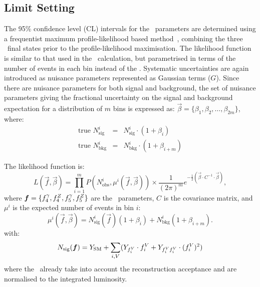 \subsection{Limit Setting}
\label{sec:TGC-LimitSetting}

The 95\% confidence level (CL) intervals for the \TGC\ parameters are determined
using a frequentist maximum profile-likelihood based method~\cite{Cowan:2010js},
combining the three \lllplp\ final states prior to
the profile-likelihood maximisation. The likelihood function is similar
to that used in the \cx\ calculation, but parametrised in terms of the
number of events in each bin instead of the \cx. Systematic uncertainties are
again introduced as nuisance parameters 
represented as Gaussian terms ($G$). Since there are nuisance
parameters for both signal and background, the set of nuisance parameters giving
the fractional uncertainty on the signal and background expectation for a
distribution of $m$ bins is expressed as:
$\vec\beta = \{\beta_1, \beta_2, \ldots, \beta_{2m}\}$, where:
\begin{eqnarray}
\text{true }N_\mathrm{sig}^i &=& N_\mathrm{sig}^i \cdot (1 + \beta_i) \label{nuis1}\\
\text{true }N_\mathrm{bkg}^i &=& N_\mathrm{bkg}^i \cdot (1 + \beta_{i+m}) \label{nuis2}
\end{eqnarray}

The likelihood function is:
\begin{equation}
L(\vec{f}, \vec{\beta}) =
\prod_{i=1}^{m}P(N_\mathrm{obs}^i,\mu^i(\vec{f},\vec\beta))
\times
\frac{1}{(2\pi)^m}e^{-\frac{1}{2}\left(\vec\beta\cdot C^{-1}\cdot\vec\beta\right)},
\label{likelihood}
\end{equation}
where $\vec{f}=\{\ffourg, \ffourZ, \ffiveg, \ffiveZ \}$ are the \TGC\
parameters, $C$ is the covariance matrix, and $\mu^{i}$ is the expected number of events in bin $i$:
\begin{equation}
\mu^i(\vec{f},\vec{\beta})
= N_\mathrm{sig}^i(\vec{f})(1 + \beta_i) + N_\mathrm{bkg}^i(1 + \beta_{i+m}).
\end{equation}
with:
\begin{equation}
N_{\rm sig}(\vec{f}) =  Y_\mathrm{\rm SM} + \sum_{i,V} (Y_{f_i^V}\cdot
f_i^V + Y_{f_i^Vf_i^V}\cdot (f_i^V)^2 ) 
\end{equation}
where the \Yij\ already take into account the reconstruction acceptance and are
normalised to the integrated luminosity.

